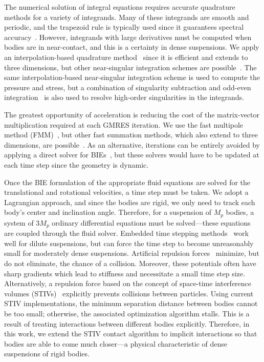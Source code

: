 \documentclass[preprint, 10pt]{elsarticle}
\begin{document}
The numerical solution of integral equations requires accurate
quadrature methods for a variety of integrands.  Many of these
integrands are smooth and periodic, and the trapezoid rule is typically
used since it guarantees spectral accuracy~\cite{Trefethan2014}.
However, integrands with large derivatives must be computed when bodies
are in near-contact, and this is a certainty in dense suspensions.  We
apply an interpolation-based quadrature method~\cite{Ying2006,
Quaife2014} since it is efficient and extends to three dimensions, but
other near-singular integration schemes are possible~\cite{Klockner2013,
Barnett2015, Beale2016, Helsing2008, Kropinski1999, Mammoli2006,
Siegel2018}.  The same interpolation-based near-singular integration
scheme is used to compute the pressure and stress, but a combination of
singularity subtraction and odd-even integration~\cite{sid-isr1988,
Quaife2014} is also used to resolve high-order singularities in the
integrands.

The greatest opportunity of acceleration is reducing the cost of the
matrix-vector multiplication required at each GMRES iteration.  We use
the fast multipole method (FMM)~\cite{Greengard1987,Greenbaum1992},
but other fast summation methods, which also extend to three dimensions,
are possible~\cite{bar-hut1986, kli-tor2014}.  As an alternative,
iterations can be entirely avoided by applying a direct solver for
BIEs~\cite{mar-bar-gil-vee2016}, but these solvers would have to be
updated at each time step since the geometry is dynamic.

Once the BIE formulation of the appropriate fluid equations are solved
for the translational and rotational velocities, a time step must be
taken.  We adopt a Lagrangian approach, and since the bodies are rigid,
we only need to track each body's center and inclination angle.
Therefore, for a suspension of $M_p$ bodies, a system of $3M_p$ ordinary
differential equations must be solved---these equations are coupled
through the fluid solver.  Embedded time stepping
methods~\cite{kli-tor2014} work well for dilute suspensions, but can
force the time step to become unreasonably small for moderately dense
suspensions. Artificial repulsion forces~\cite{Flormann2017, Liu2006,
Malhotra2018, Lu2017, Kabacogulu2017} minimize, but do not eliminate,
the chance of a collision. Moreover, these potentials often have sharp
gradients which lead to stiffness and necessitate a small time step
size. Alternatively, a repulsion force based on the concept of
space-time interference volumes (STIVs)~\cite{Harmon2011, Lu2017}
explicitly prevents collisions between particles.  Using current STIV
implementations, the minimum separation distance between bodies cannot
be too small; otherwise, the associated optimization algorithm stalls.
This is a result of treating interactions between different bodies
explicitly.  Therefore, in this work, we extend the STIV contact
algorithm to implicit interactions so that bodies are able to come much
closer---a physical characteristic of dense suspensions of rigid bodies.
\end{document}
